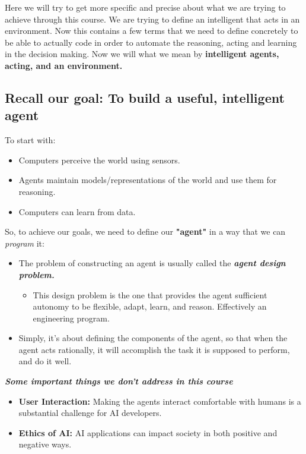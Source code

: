 \documentclass[12pt]{article}
\begin{document}
Here we will try to get more specific and precise about what we are trying to achieve through this course. 
\newline We are trying to define an intelligent that acts in an environment. Now this contains a few terms that we need to define concretely to be able to actually code in order to automate the reasoning, acting and learning in the decision making.
Now we will what we mean by \textbf{intelligent agents, acting, and an environment.}

\subsection*{Recall our goal: To build a useful, intelligent agent}
To start with:
\begin{itemize}
    \item Computers perceive the world using sensors.
    \item Agents maintain models/representations of the world and use them for reasoning. 
    \item Computers can learn from data.
\end{itemize}

\noindent So, to achieve our goals, we need to define our \textbf{"agent"} in a way that we can \emph{program} it:
\begin{itemize}
    \item The problem of constructing an agent is usually called the \textbf{\emph{agent design problem.}}
    \begin{itemize}
        \item This design problem is the one that provides the agent sufficient autonomy to be flexible, adapt, learn, and reason. Effectively an engineering program.
    \end{itemize}
    \item Simply, it's about defining the components of the agent, so that when the agent acts rationally, it will accomplish the task it is supposed to perform, and do it well.
\end{itemize}

\noindent \textbf{\emph{Some important things we don't address in this course}}
\begin{itemize}
    \item \textbf{User Interaction:} Making the agents interact comfortable with humans is a substantial challenge for AI developers.
    \item \textbf{Ethics of AI:} AI applications can impact society in both positive and negative ways.
\end{itemize}
\end{document}

